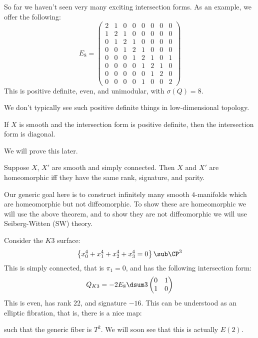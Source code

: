 \documentclass{amsart}
\begin{document}
\begin{exm}
So far we haven't seen very many exciting intersection forms. 
As an example, we offer the following:
\begin{equation}
E_8 = 
\begin{pmatrix}
2 & 1 & 0 & 0 & 0 & 0 & 0 & 0 \\
1 & 2 & 1 & 0 & 0 & 0 & 0 & 0 \\
0 & 1 & 2 & 1 & 0 & 0 & 0 & 0 \\
0 & 0 & 1 & 2 & 1 & 0 & 0 & 0 \\
0 & 0 & 0 & 1 & 2 & 1 & 0 & 1 \\
0 & 0 & 0 & 0 & 1 & 2 & 1 & 0 \\
0 & 0 & 0 & 0 & 0 & 1 & 2 & 0 \\
0 & 0 & 0 & 0 & 1 & 0 & 0 & 2
\end{pmatrix}
\end{equation}
This is positive definite, even, and unimodular, with $\sigma\left( Q \right) = 8$.
\end{exm}

\begin{rmk}
We don't typically see such positive definite things in low-dimensional topology.
\end{rmk}

\begin{thm}[Donaldson]
If $X$ is smooth and the intersection form is positive definite, then the intersection
form is diagonal. 
\end{thm}

We will prove this later.

\begin{cor}
Suppose $X$, $X'$ are smooth and simply connected. 
Then $X$ and $X'$ are homeomorphic iff they have the same rank, 
signature, and parity.
\end{cor}

Our generic goal here is to construct infinitely many smooth 
$4$-manifolds which are homeomorphic but not diffeomorphic.
To show these are homeomorphic we will use the above theorem, 
and to show they are not diffeomorphic we will use Seiberg-Witten (SW) theory.

\begin{exm}
Consider the $K3$ surface:
\begin{equation}
\left\{ x_0^4 + x_1^4 + x_2^4 + x_3^4 = 0 \right\} \sub \CP^3
\end{equation}
This is simply connected, that is $\pi_1 = 0$, 
and has the following intersection form:
\begin{equation}
Q_{K3} = -2 E_8 \dsum 3 
\begin{pmatrix}
0 & 1 \\ 1 & 0
\end{pmatrix}
\end{equation}
This is even, has rank $22$, and signature $-16$.
This can be understood as an elliptic fibration, that is, 
there is a nice map:
such that the generic fiber is $T^2$.
We will soon see that this is actually $E\left( 2 \right)$.
\end{exm}
\end{document}
